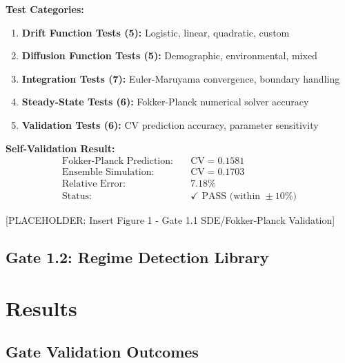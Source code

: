\documentclass[11pt]{article}
\newcommand{\cv}{\text{CV}}
\begin{document}
\textbf{Test Categories:}
\begin{enumerate}
\item \textbf{Drift Function Tests (5):} Logistic, linear, quadratic, custom
\item \textbf{Diffusion Function Tests (5):} Demographic, environmental, mixed
\item \textbf{Integration Tests (7):} Euler-Maruyama convergence, boundary handling
\item \textbf{Steady-State Tests (6):} Fokker-Planck numerical solver accuracy
\item \textbf{Validation Tests (6):} CV prediction accuracy, parameter sensitivity
\end{enumerate}

\textbf{Self-Validation Result:}
\begin{align*}
\text{Fokker-Planck Prediction:} & \quad \cv = 0.1581 \\
\text{Ensemble Simulation:} & \quad \cv = 0.1703 \\
\text{Relative Error:} & \quad 7.18\% \\
\text{Status:} & \quad \checkmark \text{ PASS (within } \pm 10\%)
\end{align*}

[PLACEHOLDER: Insert Figure 1 - Gate 1.1 SDE/Fokker-Planck Validation]

\subsection{Gate 1.2: Regime Detection Library}



\section{Results}

\subsection{Gate Validation Outcomes}


\end{document}
